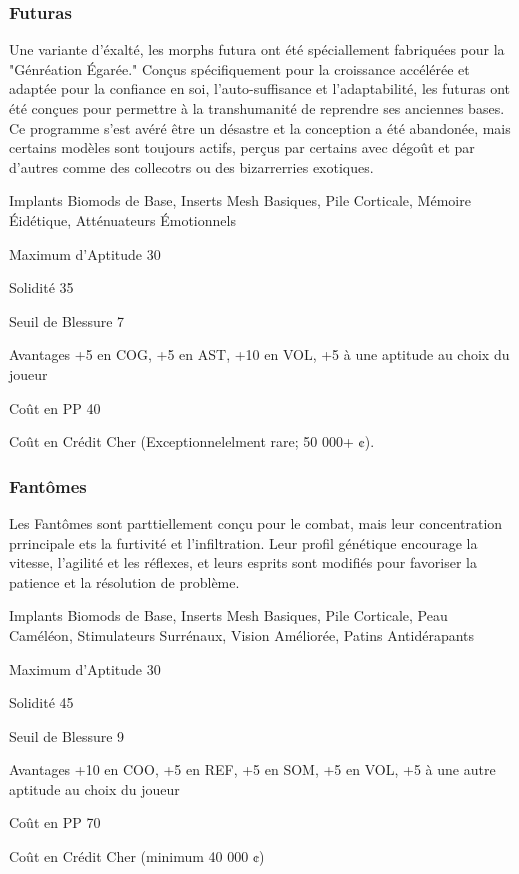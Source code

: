 \subsubsection{Futuras} \label{sec:starting-futuras} 

Une variante d'éxalté, les morphs futura ont été spéciallement fabriquées pour la "Génréation Égarée." Conçus spécifiquement pour la croissance accélérée et adaptée pour la confiance en soi, l'auto-suffisance et l'adaptabilité, les futuras ont été conçues pour permettre à la transhumanité de reprendre ses anciennes bases. Ce programme s'est avéré être un désastre et la conception a été abandonée, mais certains modèles sont toujours actifs, perçus par certains avec dégoût et par d'autres comme des collecotrs ou des bizarrerries exotiques. 

\begin{description*} \item[Implants] Biomods de Base, Inserts Mesh Basiques, Pile Corticale, Mémoire Éidétique, Atténuateurs Émotionnels\item[Maximum d'Aptitude] 30 \item[Solidité] 35 \item[Seuil de Blessure] 7 \item[Avantages] +5 en COG, +5 en AST, +10 en VOL, +5 à une aptitude au choix du joueur\item[Coût en PP] 40 \item[Coût en Crédit] Cher (Exceptionnelelment rare; 50 000+ ¢). \end{description*} 

\subsubsection{Fantômes} \label{sec:starting-ghosts} 

Les Fantômes sont parttiellement conçu pour le combat, mais leur concentration prrincipale ets la furtivité et l'infiltration. Leur profil génétique encourage la vitesse, l'agilité et les réflexes, et leurs esprits sont modifiés pour favoriser la patience et la résolution de problème. 

\begin{description*} \item[Implants] Biomods de Base, Inserts Mesh Basiques, Pile Corticale, Peau Caméléon, Stimulateurs Surrénaux, Vision Améliorée, Patins Antidérapants\item[Maximum d'Aptitude] 30 \item [Solidité] 45 \item[Seuil de Blessure] 9 \item[Avantages] +10 en COO, +5 en REF, +5 en SOM, +5 en VOL, +5 à une autre aptitude au choix du joueur\item[Coût en PP] 70 \item[Coût en Crédit] Cher (minimum 40 000 ¢) \end{description*} 


